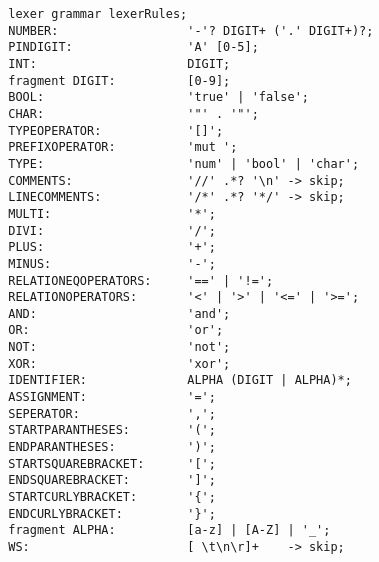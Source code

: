 \begin{listing}[htb!]
    \begin{verbatim}
        lexer grammar lexerRules;
        NUMBER:                  '-'? DIGIT+ ('.' DIGIT+)?;
        PINDIGIT:                'A' [0-5];
        INT:                     DIGIT;
        fragment DIGIT:          [0-9];
        BOOL:                    'true' | 'false';
        CHAR:                    '"' . '"';
        TYPEOPERATOR:            '[]';
        PREFIXOPERATOR:          'mut ';
        TYPE:                    'num' | 'bool' | 'char';
        COMMENTS:                '//' .*? '\n' -> skip;
        LINECOMMENTS:            '/*' .*? '*/' -> skip;
        MULTI:                   '*';
        DIVI:                    '/';
        PLUS:                    '+';
        MINUS:                   '-';
        RELATIONEQOPERATORS:     '==' | '!=';
        RELATIONOPERATORS:       '<' | '>' | '<=' | '>=';
        AND:                     'and';
        OR:                      'or';
        NOT:                     'not';
        XOR:                     'xor';
        IDENTIFIER:              ALPHA (DIGIT | ALPHA)*;
        ASSIGNMENT:              '=';
        SEPERATOR:               ',';
        STARTPARANTHESES:        '(';
        ENDPARANTHESES:          ')';
        STARTSQUAREBRACKET:      '[';
        ENDSQUAREBRACKET:        ']';
        STARTCURLYBRACKET:       '{';
        ENDCURLYBRACKET:         '}';
        fragment ALPHA:          [a-z] | [A-Z] | '_';
        WS:                      [ \t\n\r]+    -> skip;
    \end{verbatim}
\end{listing}

\clearpage
